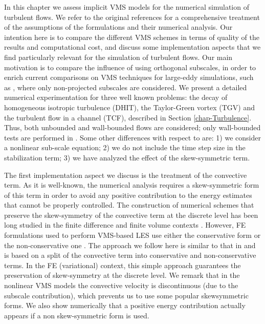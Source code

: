 In this chapter we assess implicit VMS models for the numerical simulation of turbulent flows. We refer to the original references for a comprehensive treatment of the assumptions of the formulations and their numerical analysis. Our intention here is to compare the different VMS schemes in terms of quality of the results and computational cost, and discuss some implementation aspects that we find particularly relevant for the simulation of turbulent flows. Our main motivation is to compare the influence of using orthogonal subscales, in order to enrich current comparisons on VMS techniques for large-eddy simulations, such as \cite{gamnitzer_time-dependent_2010}, where only non-projected subscales are considered. We present a detailed numerical experimentation for three well known problems: the decay of homogeneous isotropic turbulence (DHIT), the Taylor-Green vortex (TGV) and the turbulent flow in a channel (TCF), described in Section \ref{chap-Turbulence}. Thus, both unbounded and wall-bounded flows are considered; only wall-bounded tests are performed in \cite{gamnitzer_time-dependent_2010}. Some other differences with respect to \cite{gamnitzer_time-dependent_2010} are: 1) we consider a nonlinear sub-scale equation; 2) we do not include the time step size in the stabilization term; 3) we have analyzed the effect of the skew-symmetric term. 
 
The first implementation aspect we discuss is the treatment of the convective term. As it is well-known, the numerical analysis \cite{Badia2013Convergence,Burman2009,guermond_faedogalerkin_2007} requires a skew-symmetric form of this term in order to avoid any positive contribution to the energy estimates that cannot be properly controlled. The construction of numerical schemes that preserve the skew-symmetry of the convective term at the discrete level has been long studied in the finite difference and finite volume contexts \cite{arakawa_computational_1966, verstappen_symmetry-preserving_2003, gassner_skew-symmetric_2013, trias_symmetry-preserving_2014, del_rey_fernandez_review_2014, svard_review_2014}. However, FE formulations used to perform VMS-based LES use either the conservative form \cite{Hughes2000,Koobus2004,bazilevs_variational_2007,Calderer2013, Calo_2004,gamnitzer_time-dependent_2010,gravemeier_algebraic_2010,masud_variational_2011} or the non-conservative one \cite{john_variants_2008,codina_time_2007,Principe2009}. The approach we follow here is similar to that in \cite{Temam_1984} and is based on a split of the convective term into conservative and non-conservative terms. In the FE (variational) context, this simple approach guarantees the preservation of skew-symmetry at the discrete level. We remark that in the nonlinear VMS models the convective velocity is discontinuous (due to the subscale contribution), which prevents us to use some popular skewsymmetric forms. We also show numerically that a positive energy contribution actually appears if a non skew-symmetric form is used. 

